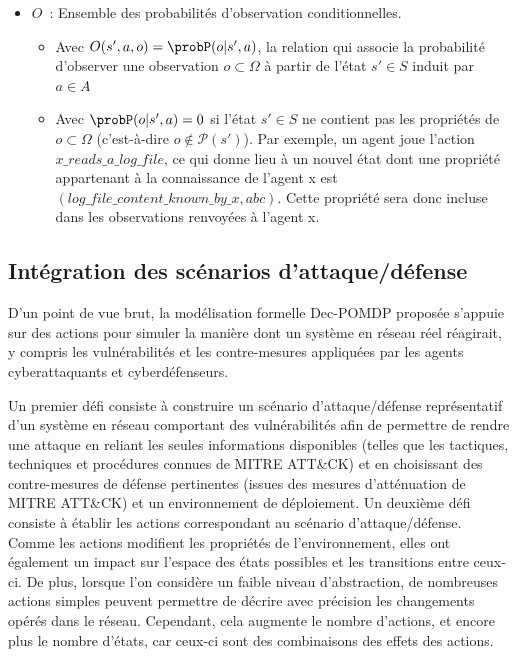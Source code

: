 \begin{itemize}
  \item $O$~: Ensemble des probabilités d'observation conditionnelles.
        \begin{itemize}
          \item Avec $O(s',a,o) = \probP(o|s',a)$, la relation qui associe la probabilité d'observer une observation $o \subset \Omega$ à partir de l'état $s' \in S$ induit par $a \in A$
          \item Avec $\probP(o|s',a) = 0$ si l'état $s' \in S$ ne contient pas les propriétés de $o \subset \Omega$ (c'est-à-dire $o \not\in \mathcal{P}(s')$). Par exemple, un agent joue l'action $x\_reads\_a\_log\_file$, ce qui donne lieu à un nouvel état dont une propriété appartenant à la connaissance de l'agent x est $(log\_file\_content\_known\_by\_x, \allowbreak abc)$. Cette propriété sera donc incluse dans les observations renvoyées à l'agent x.
        \end{itemize}

\end{itemize}


\subsection{Intégration des scénarios d'attaque/défense\label{sec:ad_integration}}

\noindent
D'un point de vue brut, la modélisation formelle Dec-POMDP proposée s'appuie sur des actions pour simuler la manière dont un système en réseau réel réagirait, y compris les vulnérabilités et les contre-mesures appliquées par les agents cyberattaquants et cyberdéfenseurs.

Un premier défi consiste à construire un scénario d'attaque/défense représentatif d'un système en réseau comportant des vulnérabilités afin de permettre de rendre une attaque en reliant les seules informations disponibles (telles que les tactiques, techniques et procédures connues de MITRE ATT\&CK) et en choisissant des contre-mesures de défense pertinentes (issues des mesures d'atténuation de MITRE ATT\&CK) et un environnement de déploiement. Un deuxième défi consiste à établir les actions correspondant au scénario d'attaque/défense. Comme les actions modifient les propriétés de l'environnement, elles ont également un impact sur l'espace des états possibles et les transitions entre ceux-ci.
De plus, lorsque l'on considère un faible niveau d'abstraction, de nombreuses actions simples peuvent permettre de décrire avec précision les changements opérés dans le réseau. Cependant, cela augmente le nombre d'actions, et encore plus le nombre d'états, car ceux-ci sont des combinaisons des effets des actions.

